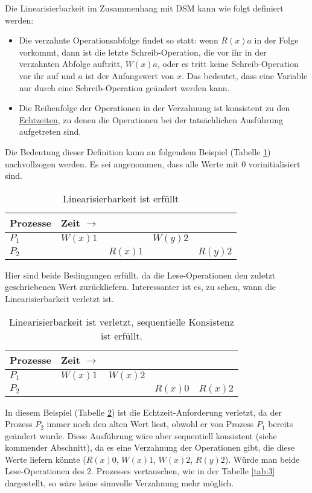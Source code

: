 Die Linearisierbarkeit im Zusammenhang mit DSM kann wie folgt definiert werden:
\begin{itemize}
	\item Die verzahnte Operationsabfolge findet so statt: wenn $R(x)a$ in der Folge vorkommt, dann ist die letzte Schreib-Operation, die vor ihr in der verzahnten Abfolge auftritt, $W(x)a$, oder es tritt keine Schreib-Operation vor ihr auf und $a$ ist der Anfangswert von $x$. Das bedeutet, dass eine Variable nur durch eine Schreib-Operation geändert werden kann.
	\item Die Reihenfolge der Operationen in der Verzahnung ist konsistent zu den \underline{Echtzeiten}, zu denen die Operationen bei der tatsächlichen Ausführung aufgetreten sind.
\end{itemize}

Die Bedeutung dieser Definition kann an folgendem Beispiel (Tabelle \ref{tab:1}) nachvollzogen werden. Es sei angenommen, dass alle Werte mit $0$ vorinitialisiert sind.

\begin{table}
	\centering
	\begin{tabular}{l | l l l l}
		\textbf{Prozesse} & \textbf{Zeit} $\rightarrow$ & \\
		\hline
		$P_{1}$ & $W(x)1$ & & $W(y)2$ \\
		$P_{2}$ & & $R(x)1$ & & $R(y)2$ \\
	\end{tabular}
	\caption{Linearisierbarkeit ist erfüllt}
	\label{tab:1}
\end{table}

Hier sind beide Bedingungen erfüllt, da die Lese-Operationen den zuletzt geschriebenen Wert zurückliefern. Interessanter ist es, zu sehen, wann die Linearisierbarkeit verletzt ist.

\begin{table}
	\centering
	\begin{tabular}{l | l l l l}
		\textbf{Prozesse} & \textbf{Zeit} $\rightarrow$ \\
		\hline
		$P_{1}$ & $W(x)1$ & $W(x)2$ \\
		$P_{2}$ & & & \color{red} $R(x)0$ & \color{black} $R(x)2$ \\
	\end{tabular}
	\caption{Linearisierbarkeit ist verletzt, sequentielle Konsistenz ist erfüllt.}
	\label{tab:2}
\end{table}

In diesem Beispiel (Tabelle \ref{tab:2}) ist die Echtzeit-Anforderung verletzt, da der Prozess $P_{2}$ immer noch den alten Wert liest, obwohl er von Prozess $P_{1}$ bereits geändert wurde. Diese Ausführung wäre aber sequentiell konsistent (siehe kommender Abschnitt), da es eine Verzahnung der Operationen gibt, die diese Werte liefern könnte ($R(x)0$, $W(x)1$, $W(x)2$, $R(y)2$). Würde man beide Lese-Operationen des 2. Prozesses vertauschen, wie in der Tabelle \ref{tab:3} dargestellt, so wäre keine sinnvolle Verzahnung mehr möglich.

